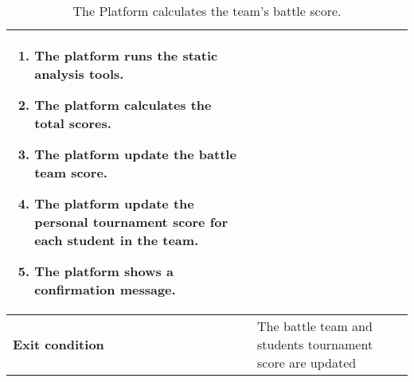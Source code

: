 \begin{enumerate}[label=\textbf{UC\arabic*}:,leftmargin=1.3cm]
\begin{table}[H]
\begin{tabular}{|l|p{11.9cm}|}
\begin{enumerate}[label=\arabic*.]
                              \item The platform runs the static analysis tools.
                              \item The platform calculates the total scores.
                              \item The platform update the battle team score.
                              \item The platform update the personal tournament score for each student in the team.
                              \item The platform shows a confirmation message.
                        \end{enumerate} \\\hline
                        \textbf{Exit condition}  & The battle team and students tournament score are updated                              \\\hline
                  \end{tabular}
                  \caption{The Platform calculates the team's battle score.}
                  \label{table:Student makes a new push}
            \end{table}


\end{enumerate}
